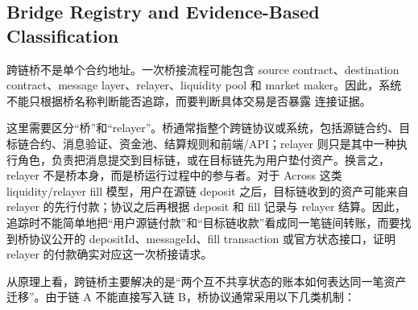 \documentclass[12pt,a4paper]{ctexart}
\begin{document}
\hypertarget{bridge-名单-and-基于证据-classification}{%
\subsection{Bridge Registry and Evidence-Based
Classification}\label{bridge-名单-and-基于证据-classification}}

跨链桥不是单个合约地址。一次桥接流程可能包含 source
contract、destination contract、message layer、relayer、liquidity pool
和 market
maker。因此，系统不能只根据桥名称判断能否追踪，而要判断具体交易是否暴露
连接证据。

这里需要区分``桥''和``relayer''。桥通常指整个跨链协议或系统，包括源链合约、目标链合约、消息验证、资金池、结算规则和前端/API；relayer 则只是其中一种执行角色，负责把消息提交到目标链，或在目标链先为用户垫付资产。换言之，relayer 不是桥本身，而是桥运行过程中的参与者。对于 Across 这类 liquidity/relayer fill 模型，用户在源链 deposit 之后，目标链收到的资产可能来自 relayer 的先行付款；协议之后再根据 deposit 和 fill 记录与 relayer 结算。因此，追踪时不能简单地把``用户源链付款''和``目标链收款''看成同一笔链间转账，而要找到桥协议公开的 depositId、messageId、fill transaction 或官方状态接口，证明 relayer 的付款确实对应这一次桥接请求。

从原理上看，跨链桥主要解决的是``两个互不共享状态的账本如何表达同一笔资产迁移''。由于链
A 不能直接写入链 B，桥协议通常采用以下几类机制：
\end{document}
